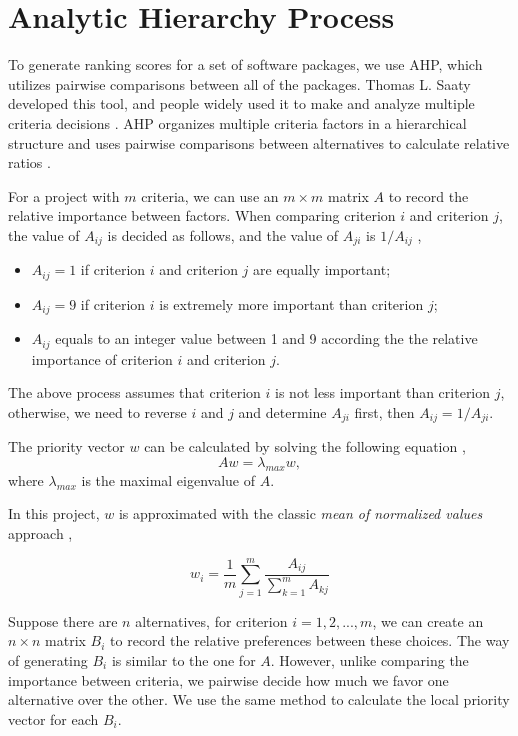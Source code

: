 \section{Analytic Hierarchy Process}
\label{sec_AHP}
To generate ranking scores for a set of software packages, we use AHP, which utilizes pairwise comparisons between all of the packages. Thomas L. Saaty developed this tool, and people widely used it to make and analyze multiple criteria decisions \cite{VaidyaEtAl2006}. AHP organizes multiple criteria factors in a hierarchical structure and uses pairwise comparisons between alternatives to calculate relative ratios \cite{Saaty1990}.

For a project with $ m $ criteria, we can use an $m\times m$ matrix $A$ to record the relative importance between factors. When comparing criterion $i$ and criterion $j$, the value of $A_{ij}$ is decided as follows, and the value of $A_{ji}$ is $1/A_{ij}$ \cite{Saaty1990},
\begin{itemize}
	\item $A_{ij} = 1$ if criterion $i$ and criterion $j$ are equally important;
	\item $A_{ij} = 9$ if criterion $i$ is extremely more important than criterion $j$;
	\item $A_{ij}$ equals to an integer value between 1 and 9 according the the relative importance of criterion $i$ and criterion $j$.
\end{itemize}

The above process assumes that criterion $i$ is not less important than criterion $j$, otherwise, we need to reverse $i$ and $j$ and determine $A_{ji}$ first, then $A_{ij} = 1/A_{ji}$.

The priority vector $w$ can be calculated by solving the following equation \cite{Saaty1990}, \begin{equation}
Aw = \lambda_{max}w,
\end{equation}
where $\lambda_{max}$ is the maximal eigenvalue of $A$.

In this project, $w$ is approximated with the classic \textit{mean of normalized values} approach \cite{AlessioEtAl2006},

\begin{equation}
w_i = \frac{1}{m}\sum_{j=1}^{m}\frac{A_{ij}}{\sum_{k=1}^{m}A_{kj}}
\end{equation}

Suppose there are $n$ alternatives, for criterion $i = 1, 2, ... , m$, we can create an $n\times n$ matrix $B_i$ to record the relative preferences between these choices. The way of generating $B_i$ is similar to the one for $A$. However, unlike comparing the importance between criteria, we pairwise decide how much we favor one alternative over the other. We use the same method to calculate the local priority vector for each $B_i$.

